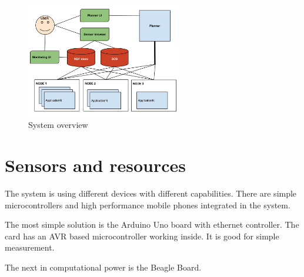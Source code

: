 \begin{figure}[h]
	\centering
	\includegraphics[width=0.6\textwidth]{figures/sysarch.png}
	\caption{System overview\label{fig:sysover}}
\end{figure}

\section{Sensors and resources}
The system is using different devices with different capabilities. There are simple microcontrollers and high performance mobile phones integrated in the system. 

The most simple solution is the Arduino Uno board with ethernet controller. The card has an AVR based microcontroller working inside. It is good for simple measurement. 

The next in computational power is the Beagle Board. 